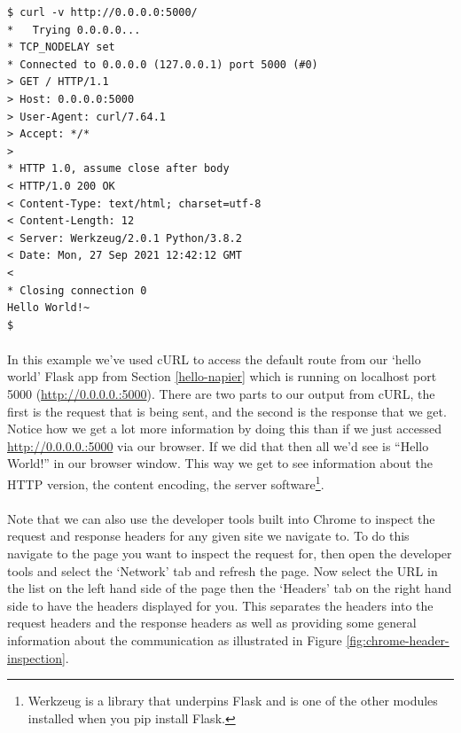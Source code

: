 \documentclass[12pt, a4paper, oneside]{book}
\begin{document}
{\begin{lstlisting}[style=DOS]
$ curl -v http://0.0.0.0:5000/
*   Trying 0.0.0.0...
* TCP_NODELAY set
* Connected to 0.0.0.0 (127.0.0.1) port 5000 (#0)
> GET / HTTP/1.1
> Host: 0.0.0.0:5000
> User-Agent: curl/7.64.1
> Accept: */*
> 
* HTTP 1.0, assume close after body
< HTTP/1.0 200 OK
< Content-Type: text/html; charset=utf-8
< Content-Length: 12
< Server: Werkzeug/2.0.1 Python/3.8.2
< Date: Mon, 27 Sep 2021 12:42:12 GMT
< 
* Closing connection 0
Hello World!~
$ 
\end{lstlisting}

\paragraph{} In this example we've used cURL to access the default route from our `hello world' Flask app from Section \ref{hello-napier} which is running on localhost port 5000 (\url{http://0.0.0.0.:5000}). There are two parts to our output from cURL, the first is the request that is being sent, and the second is the response that we get. Notice how we get a lot more information by doing this than if we just accessed \url{http://0.0.0.0.:5000} via our browser. If we did that then all we'd see is ``Hello World!'' in our browser window. This way we get to see information about the HTTP version, the content encoding, the server software\footnote{Werkzeug is a library that underpins Flask and is one of the other modules installed when you pip install Flask.}.

\paragraph{} Note that we can also use the developer tools built into Chrome to inspect the request and response headers for any given site we navigate to. To do this navigate to the page you want to inspect the request for, then open the developer tools and select the `Network' tab and refresh the page. Now select the URL in the list on the left hand side of the page then the `Headers' tab on the right hand side to have the headers displayed for you. This separates the headers into the request headers and the response headers as well as providing some general information about the communication as illustrated in Figure \ref{fig:chrome-header-inspection}.

}
\end{document}
